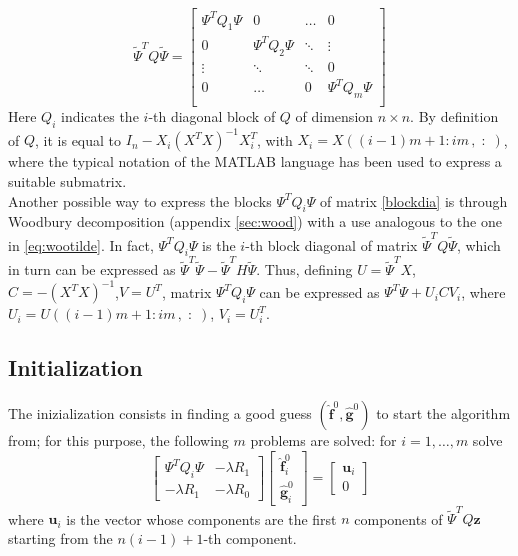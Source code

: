 \begin{equation}
    \label{blockdia}
    \tilde{\Psi}^TQ\tilde{\Psi} =
    \begin{bmatrix}
        \Psi^TQ_1\Psi & 0& \dots & 0\\
        0 & \Psi^TQ_2\Psi & \ddots & \vdots\\
        \vdots& \ddots& \ddots & 0 \\
        0 & \dots & 0 & \Psi^TQ_m\Psi\\
    \end{bmatrix}    
\end{equation}
Here $Q_i$ indicates the $i$-th diagonal block of $Q$ of dimension $n \times n$. By definition of $Q$, it is equal to $I_n-X_i(X^TX)^{-1}X_i^T$, with $X_i=X((i-1)m+1 : im\,, \;:\; )$, where the typical notation of the MATLAB language has been used to express a suitable submatrix.\\
Another possible way to express the blocks $\Psi^TQ_i\Psi$ of matrix \ref{blockdia} is through Woodbury decomposition (appendix \ref{sec:wood}) with a use analogous to the one in \ref{eq:wootilde}. In fact, $\Psi^TQ_i\Psi$ is the $i$-th block diagonal of matrix $\tilde{\Psi}^TQ\tilde{\Psi}$, which in turn can be expressed as $\tilde{\Psi}^T\tilde{\Psi}-\tilde{\Psi}^TH\tilde{\Psi}$. Thus, defining $U = \tilde{\Psi}^TX$, $C = -(X^TX)^{-1}$,$V =U^T$, matrix $\Psi^TQ_i\Psi$ can be expressed as $\Psi^T\Psi +  U_iCV_i $, where $U_i = U((i-1)m+1 : im\,, \;:\;)$, $V_i = U_i^T $.

\subsection{Initialization}
The inizialization consists in finding a good guess $(\hat{\mathbf{f}}^0,\hat{\mathbf{g}}^0)$ to start the algorithm from; for this purpose, the following $m$ problems are solved: for $i = 1, \dots, m$ solve
\begin{equation}
        \begin{bmatrix}
            \Psi^TQ_i\Psi & -\lambda R_1\\
            -\lambda R_1  & -\lambda R_0
        \end{bmatrix}
        \begin{bmatrix}
            \hat{\mathbf{f}}_i^0\\
            \hat{\mathbf{g}}_i^0
        \end{bmatrix}
        =
        \begin{bmatrix}
            \mathbf{u}_i\\
            0
        \end{bmatrix}
\end{equation}
where $\mathbf{u}_i$ is the vector whose components are the first $n$ components of $\tilde{\Psi}^T Q\mathbf{z}$ starting from the $n(i-1) +1$-th component.

